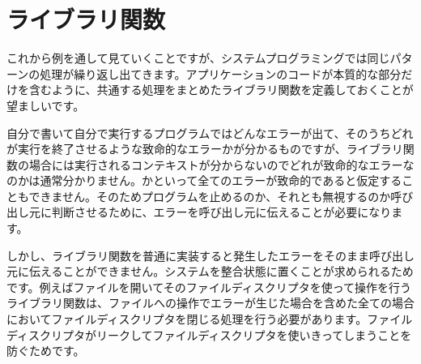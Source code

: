 \section{ライブラリ関数}

これから例を通して見ていくことですが、システムプログラミングでは同じパターンの処理が繰り返し出てきます。アプリケーションのコードが本質的な部分だけを含むように、共通する処理をまとめたライブラリ関数を定義しておくことが望ましいです。

自分で書いて自分で実行するプログラムではどんなエラーが出て、そのうちどれが実行を終了させるような致命的なエラーかが分かるものですが、ライブラリ関数の場合には実行されるコンテキストが分からないのでどれが致命的なエラーなのかは通常分かりません。かといって全てのエラーが致命的であると仮定することもできません。そのためプログラムを止めるのか、それとも無視するのか呼び出し元に判断させるために、エラーを呼び出し元に伝えることが必要になります。

しかし、ライブラリ関数を普通に実装すると発生したエラーをそのまま呼び出し元に伝えることができません。システムを整合状態に置くことが求められるためです。例えばファイルを開いてそのファイルディスクリプタを使って操作を行うライブラリ関数は、ファイルへの操作でエラーが生じた場合を含めた全ての場合においてファイルディスクリプタを閉じる処理を行う必要があります。ファイルディスクリプタがリークしてファイルディスクリプタを使いきってしまうことを防ぐためです。


